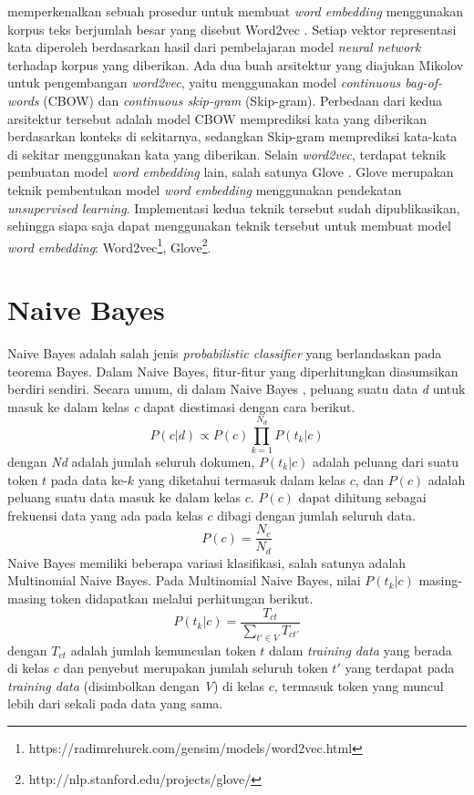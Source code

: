 	\cite{DBLP:journals/corr/abs-1301-3781} memperkenalkan sebuah prosedur untuk membuat \textit{word embedding} menggunakan korpus teks berjumlah besar yang disebut Word2vec \citep{DBLP:journals/corr/abs-1301-3781}. Setiap vektor representasi kata diperoleh berdasarkan hasil dari pembelajaran model \textit{neural network} terhadap korpus yang diberikan.
	Ada dua buah arsitektur yang diajukan Mikolov untuk pengembangan \textit{word2vec}, yaitu menggunakan model \textit{continuous bag-of-words} (CBOW) dan \textit{continuous skip-gram} (Skip-gram). Perbedaan dari kedua arsitektur tersebut adalah model CBOW memprediksi kata yang diberikan berdasarkan konteks di sekitarnya, sedangkan Skip-gram memprediksi kata-kata di sekitar menggunakan kata yang diberikan. Selain \textit{word2vec}, terdapat teknik pembuatan model \textit{word embedding} lain, salah satunya Glove \citep{pennington2014glove}. Glove merupakan teknik pembentukan model \textit{word embedding} menggunakan pendekatan \textit{unsupervised learning}. Implementasi kedua teknik tersebut sudah  dipublikasikan, sehingga siapa saja dapat menggunakan teknik tersebut untuk membuat model \textit{word embedding}: Word2vec\footnote{https://radimrehurek.com/gensim/models/word2vec.html}, Glove\footnote{http://nlp.stanford.edu/projects/glove/}.

\section{Naive Bayes} 
Naive Bayes adalah salah jenis \textit{probabilistic classifier} yang berlandaskan pada teorema Bayes. Dalam Naive Bayes, fitur-fitur yang diperhitungkan diasumsikan berdiri sendiri. Secara umum, di dalam Naive Bayes \citep{Manning:2008:IIR:1394399}, peluang suatu data \textit{d} untuk masuk ke dalam kelas \textit{c} dapat diestimasi dengan cara berikut.
\begin{equation}
P(c|d) \propto P(c) \prod_{k=1}^{N_{d}} P(t_{k}|c)
\end{equation}
dengan \textit{Nd} adalah jumlah seluruh dokumen, $P(t_k|c)$ adalah peluang dari suatu
token $t$ pada data ke-$k$ yang
diketahui termasuk dalam kelas $c$, dan $P(c)$ adalah peluang suatu data masuk ke dalam kelas $c$. $P(c)$ dapat dihitung sebagai frekuensi data yang ada pada kelas $c$ dibagi dengan jumlah seluruh data.
\begin{equation}
P(c)=\frac{N_{c}}{N_{d}}
\end{equation}
Naive Bayes memiliki beberapa variasi klasifikasi, salah satunya adalah Multinomial Naive Bayes. Pada Multinomial Naive Bayes, nilai $P(t_k|c)$ masing-masing token didapatkan melalui perhitungan berikut. 
\begin{equation}
P(t_{k}|c)=\frac{T_{ct}}{\sum_{t'\in V}^{\, } T_{ct'}}
\end{equation}
dengan $T_{ct}$ adalah jumlah kemunculan token $t$ dalam \textit{training data} yang berada di kelas
$c$ dan penyebut merupakan jumlah seluruh token $t'$ yang
terdapat pada \textit{training data} (disimbolkan dengan \textit{V}) di kelas $c$, termasuk token yang muncul lebih dari sekali pada data yang sama.

